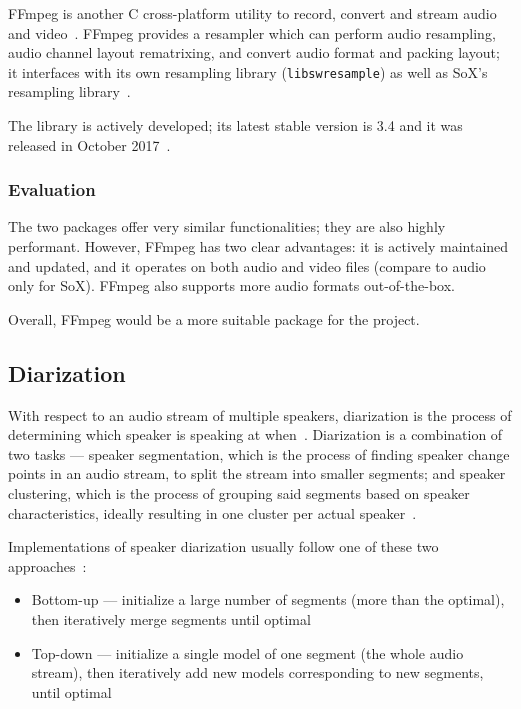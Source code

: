 FFmpeg is another C cross-platform utility to record, convert and stream
audio and video~\cite{ffmpeg}. FFmpeg provides a resampler which can
perform audio resampling, audio channel layout rematrixing, and convert
audio format and packing layout; it interfaces with its own resampling
library (\texttt{libswresample}) as well as SoX's resampling
library~\cite{ffmpeg-res,ffmpeg-libres}.

The library is actively developed; its latest stable version is 3.4
and it was released in October 2017~\cite{ffmpeg-dl}.

\subsubsection{Evaluation}

The two packages offer very similar functionalities; they are also
highly performant. However, FFmpeg has two clear advantages: it is
actively maintained and updated, and it operates on both audio and
video files (compare to audio only for SoX). FFmpeg also supports
more audio formats out-of-the-box.

Overall, FFmpeg would be a more suitable package for the project.

\subsection{Diarization}

With respect to an audio stream of multiple speakers, diarization is
the process of determining which speaker is speaking at when~\cite{diar}. 
Diarization is a combination of two tasks --- speaker segmentation,
which is the process of finding speaker change points in an audio stream,
to split the stream into smaller segments; and speaker clustering,
which is the process of grouping said segments based on speaker
characteristics, ideally resulting in one cluster per actual
speaker~\cite{diar-cls}.

Implementations of speaker diarization usually follow one of these
two approaches~\cite{diar}:

\begin{itemize}
    \item Bottom-up --- initialize a large number of segments (more than
    the optimal), then iteratively merge segments until optimal
    \item Top-down --- initialize a single model of one segment (the whole
    audio stream), then iteratively add new models corresponding to new
    segments, until optimal
\end{itemize}

